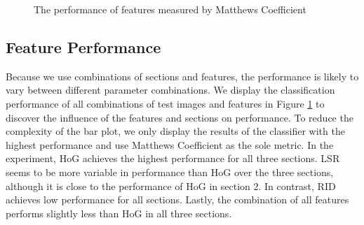 \datazero

\begin{figure}[]
	\caption{The performance of features measured by Matthews Coefficient}
	\label{fig:res_bar_0}
\end{figure}

\subsection{Feature Performance}

Because we use combinations of sections and features, the performance is likely to vary between different parameter combinations. We display the classification performance of all combinations of test images and features in Figure \ref{fig:res_bar_0} to discover the influence of the features and sections on performance. To reduce the complexity of the bar plot, we only display the results of the classifier with the highest performance and use Matthews Coefficient as the sole metric. In the experiment, HoG achieves the highest performance for all three sections. LSR seems to be more variable in performance than HoG over the three sections, although it is close to the performance of HoG in section 2. In contrast, RID achieves low performance for all sections. Lastly, the combination of all features performs slightly less than HoG in all three sections.


\dataone

